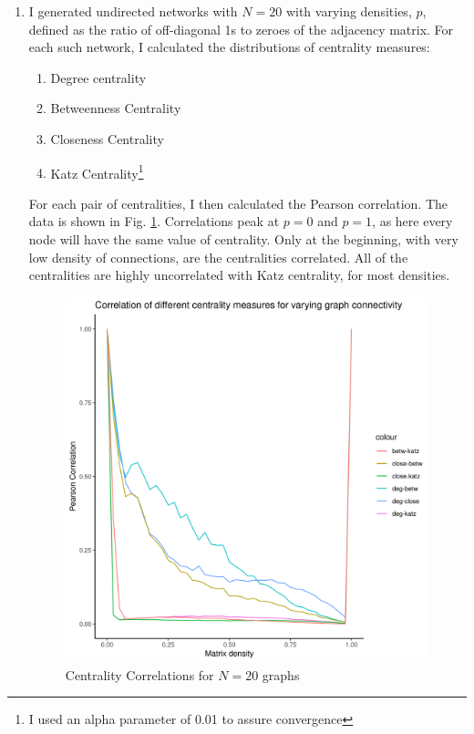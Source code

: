 \documentclass[a4paper]{article}
\begin{document}
\begin{enumerate}[label={(6. \alph*)}]
    \item I generated undirected networks with $N=20$ with varying densities, $p$, defined as the ratio of off-diagonal 1s to zeroes of the adjacency matrix. For each such network, I calculated the distributions of centrality measures:
        \begin{enumerate}
            \item Degree centrality
            \item Betweenness Centrality
            \item Closeness Centrality
            \item Katz Centrality\footnote{I used an alpha parameter of 0.01 to assure convergence}
        \end{enumerate}
        For each pair of centralities, I then calculated the Pearson correlation. The data is shown in Fig. \ref{fig:centr}. Correlations peak at $p=0$ and  $p=1$, as here every node will have the same value of centrality. Only at the beginning, with very low density of connections, are the centralities correlated. All of the centralities are highly uncorrelated with Katz centrality, for most densities.  
     \begin{figure}[h]
        \centerline{\includegraphics[width=0.9\linewidth]{./undirected_centrality.png}}
        \caption{Centrality Correlations for $N=20$ graphs}
        \label{fig:centr}
    \end{figure}



\end{enumerate}
\end{document}

